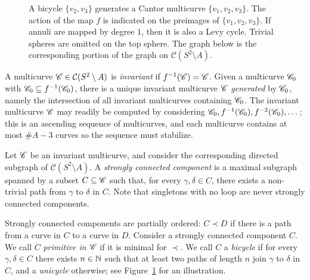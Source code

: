 \documentclass{amsart}
\begin{document}
\begin{figure}
  \caption{A bicycle $\{v_2,v_3\}$ generates a Cantor multicurve
    $\{v_1,v_2,v_3\}$. The action of the map $f$ is indicated on the
    preimages of $\{v_1,v_2,v_3\}$. If annuli are mapped by degree
    $1$, then it is also a Levy cycle. Trivial spheres are omitted on
    the top sphere. The graph below is the corresponding portion of
    the graph on $\mathcal C(S^2\setminus
    A)$.} \label{Fig:ExampleCantorMult}
\end{figure}

A multicurve ${\mathscr C}\in\mathcal C(S^2\setminus A)$ is \emph{invariant}
if $f^{-1}({\mathscr C})={\mathscr C}$. Given a multicurve ${\mathscr C}_0$ with
${\mathscr C}_0\subseteq f^{-1}({\mathscr C}_0)$, there is a unique invariant multicurve
${\mathscr C}$ \emph{generated} by ${\mathscr C}_0$, namely the intersection of all
invariant multicurves containing ${\mathscr C}_0$. The invariant multicurve
${\mathscr C}$ may readily be computed by considering
${\mathscr C}_0,f^{-1}({\mathscr C}_0),f^{-2}({\mathscr C}_0),\dots$; this is an ascending
sequence of multicurves, and each multicurve contains at most $\#A-3$
curves so the sequence must stabilize.

Let ${\mathscr C}$ be an invariant multicurve, and consider the corresponding
directed subgraph of $\mathcal C(S^2\setminus A)$. A \emph{strongly
  connected component} is a maximal subgraph spanned by a subset
$C\subseteq{\mathscr C}$ such that, for every $\gamma,\delta\in C$, there
exists a non-trivial path from $\gamma$ to $\delta$ in $C$. Note that
singletons with no loop are never strongly connected components.

Strongly connected components are partially ordered: $C\prec D$ if
there is a path from a curve in $C$ to a curve in $D$. Consider a
strongly connected component $C$. We call $C$ \emph{primitive in
  ${\mathscr C}$} if it is minimal for $\prec$. We call $C$ a \emph{bicycle} if
for every $\gamma,\delta\in C$ there exists $n\in{\mathbb N}$ such that at
least two paths of length $n$ join $\gamma$ to $\delta$ in $C$, and a
\emph{unicycle} otherwise; see Figure~\ref{Fig:ExampleCantorMult} for
an illustration.
\end{document}
